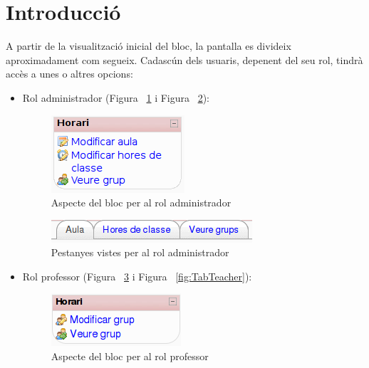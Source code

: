 \documentclass[a4paper]{report}  %
\begin{document}
\section{Introducció}
A partir de la visualització inicial del bloc, la pantalla es divideix aproximadament 	com segueix.
Cadascún dels usuaris, depenent del seu rol, tindrà accès a unes o altres opcions:\\
\begin{itemize}
\item Rol administrador (Figura ~\ref{fig:BlocProfileAdmin} i Figura ~\ref{fig:TabAdmin}):\\
\begin{figure}[H] %
\begin{center}
\includegraphics{img/BlocProfileAdmin.png}
\caption[List caption]{Aspecte del bloc per al rol administrador}
\label{fig:BlocProfileAdmin}
\end{center}
\end{figure}
\begin{figure}[H] %
\begin{center}
\includegraphics{img/TabAdmin.png}
\caption[List caption]{Pestanyes vistes per al rol administrador}
\label{fig:TabAdmin}
\end{center}
\end{figure}
\item Rol professor (Figura ~\ref{fig:BlocProfileTeacher} i Figura ~\ref{fig:TabTeacher}):\\
\begin{figure}[H] %
\begin{center}
\includegraphics{img/BlocProfileTeacher.png}
\caption[List caption]{Aspecte del bloc per al rol professor}
\label{fig:BlocProfileTeacher}
\end{center}
\end{figure}


\end{itemize}
\end{document}
